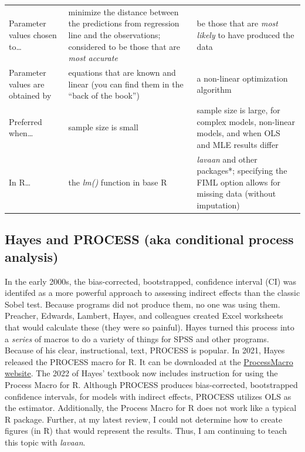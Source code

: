 \documentclass[
  11pt,
]{book}
\begin{document}
\begin{longtable}[]{@{}
  >{\centering\arraybackslash}p{}
  >{\centering\arraybackslash}p{}
  >{\centering\arraybackslash}p{}@{}}
\toprule\noalign{}
\endhead
\bottomrule\noalign{}
\endlastfoot
Parameter values chosen to\ldots{} & minimize the distance between the predictions from regression line and the observations; considered to be those that are \emph{most accurate} & be those that are \emph{most likely} to have produced the data \\
Parameter values are obtained by & equations that are known and linear (you can find them in the ``back of the book'') & a non-linear optimization algorithm \\
Preferred when\ldots{} & sample size is small & sample size is large, for complex models, non-linear models, and when OLS and MLE results differ \\
In R\ldots{} & the \emph{lm()} function in base R & \emph{lavaan} and other packages*; specifying the FIML option allows for missing data (without imputation) \\
\end{longtable}

\hypertarget{hayes-and-process-aka-conditional-process-analysis}{%
\subsection{Hayes and PROCESS (aka conditional process analysis)}\label{hayes-and-process-aka-conditional-process-analysis}}

In the early 2000s, the bias-corrected, bootstrapped, confidence interval (CI) was identifed as a more powerful approach to assessing indirect effects than the classic Sobel test. Because programs did not produce them, no one was using them. Preacher, Edwards, Lambert, Hayes, and colleagues created Excel worksheets that would calculate these (they were so painful). Hayes turned this process into a \emph{series} of macros to do a variety of things for SPSS and other programs. Because of his clear, instructional, text, PROCESS is popular. In 2021, Hayes released the PROCESS macro for R. It can be downloaded at the \href{https://www.processmacro.org/download.html}{ProcessMacro website}. The 2022 of Hayes' textbook now includes instruction for using the Process Macro for R. Although PROCESS produces bias-corrected, bootstrapped confidence intervals, for models with indirect effects, PROCESS utilizes OLS as the estimator. Additionally, the Process Macro for R does not work like a typical R package. Further, at my latest review, I could not determine how to create figures (in R) that would represent the results. Thus, I am continuing to teach this topic with \emph{lavaan}.
\end{document}
